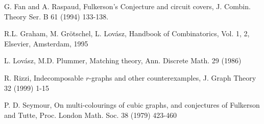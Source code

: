 \documentclass[fleqn,12pt]{article}
\begin{document}
\begin{thebibliography}{99}

 G. Fan and A. Raspaud, Fulkerson's Conjecture and circuit covers, J. Combin. Theory Ser. B 61 (1994) 133-138.

 R.L. Graham, M. Gr\"otschel, L. Lov\'asz, Handbook of Combinatorics, Vol. 1, 2, Elsevier, Amsterdam, 1995

 L. Lov\'asz, M.D. Plummer, Matching theory, Ann. Discrete Math. 29 (1986)

 R. Rizzi, Indecomposable $r$-graphs and other counterexamples, J. Graph Theory 32 (1999) 1-15

 P. D. Seymour, On multi-colourings of cubic graphs, and conjectures of Fulkerson and Tutte, Proc. London Math. Soc. 38 (1979) 423-460



\end{thebibliography}
\end{document}
